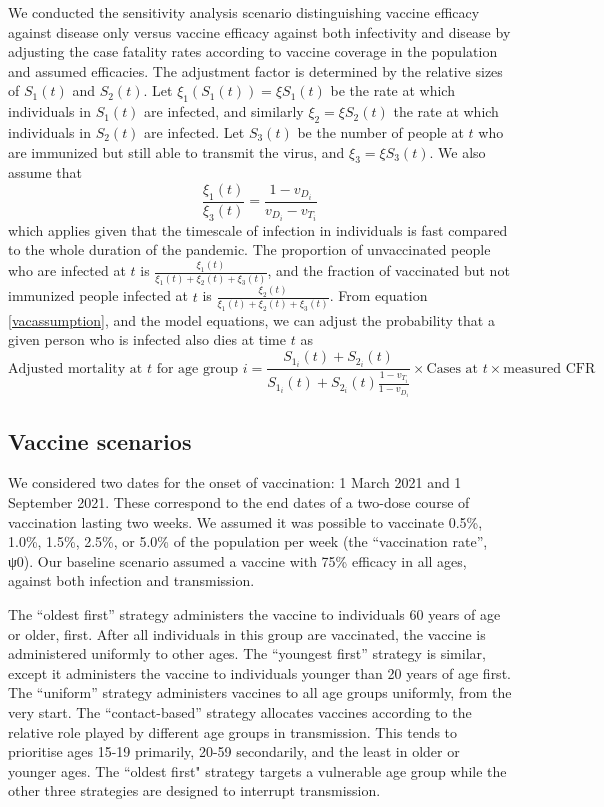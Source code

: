 We conducted the sensitivity analysis scenario distinguishing vaccine efficacy against disease only versus vaccine efficacy against both infectivity and disease by adjusting the case fatality rates according to vaccine coverage in the population and assumed efficacies. The adjustment factor is determined by the relative sizes of $S_1(t)$ and $S_2(t)$. Let $\xi_1 (S_1(t)) = \xi S_1(t)$ be the rate at which individuals in $S_1(t)$ are infected, and similarly $\xi_2 = \xi S_2(t)$ the rate at which individuals in $S_2(t)$ are infected. Let $S_3(t)$ be the number of people at $t$ who are immunized but still able to transmit the virus, and $\xi_3 = \xi S_3(t)$. We also assume that
\begin{equation}
   \frac{\xi_1(t)}{\xi_3(t)} = \frac{1 - v_{D_i}}{v_{D_i} - v_{T_i}}
   \label{vacassumption}
\end{equation}
which applies given that the timescale of infection in individuals is fast compared to the whole duration of the pandemic. The proportion of unvaccinated people who are infected at $t$ is $\frac{\xi_1(t)}{\xi_1(t) + \xi_2(t) + \xi_3(t)}$, and the fraction of vaccinated but not immunized people infected at $t$ is $\frac{\xi_2(t)}{\xi_1(t) + \xi_2(t) + \xi_3(t)}$. From equation \ref{vacassumption}, and the model equations, we can adjust the probability that a given person who is infected also dies at time $t$ as
\begin{equation}
    \textrm{Adjusted mortality at } t  \textrm{ for age group } i = \frac{S_{1_i}(t) + S_{2_i}(t)}{S_{1_i}(t) + S_{2_i}(t)\frac{1 - v_{T_i}}{1 - v_{D_i}}} \times \textrm{Cases at }t \times \textrm{measured CFR}
\end{equation}

\subsection{Vaccine scenarios} 

We considered two dates for the onset of vaccination: 1 March 2021 and 1 September 2021. These correspond to the end dates of a two-dose course of vaccination lasting two weeks. We assumed it was possible to vaccinate 0.5\%, 1.0\%, 1.5\%, 2.5\%, or 5.0\% of the population per week (the “vaccination rate”, ψ0).  Our baseline scenario assumed a vaccine with 75\% efficacy in all ages, against both infection and transmission.  

The “oldest first” strategy administers the vaccine to individuals 60 years of age or older, first.  After all individuals in this group are vaccinated, the vaccine is administered uniformly to other ages. The “youngest first” strategy is similar, except it administers the vaccine to individuals younger than 20 years of age first.  The “uniform” strategy administers vaccines to all age groups uniformly, from the very start. The “contact-based” strategy allocates vaccines according to the relative role played by different age groups in transmission. This tends to prioritise ages 15-19 primarily, 20-59 secondarily, and the least in older or younger ages.  The ``oldest first" strategy targets a vulnerable age group while the other three strategies are designed to interrupt transmission.


